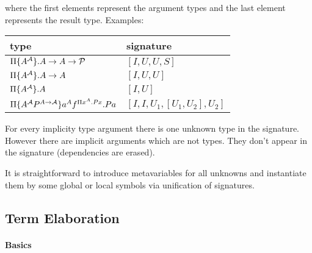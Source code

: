 where the first elements represent the argument types and the last element
represents the result type.
%
Examples:

\begin{tabular}{|l|l|}
    \hline
    type & signature
    \\ \hline
    $\Pi {\{A^{\cal A}\}}. A \to A \to {\cal P}$ &
    $[I, U, U, S]$
    \\
    $\Pi {\{A^{\cal A}\}}. A \to A$ &
    $[I, U, U]$
    \\
    $\Pi {\{A^{\cal A}\}}. A$ &
    $[I, U]$
    \\
    $\Pi {\{A^{\cal A}P^{A \to {\cal A}}\}} a^A f^{\Pi x^A. P x}. P a$ &
    $[I, I, U_1, [U_1, U_2], U_2]$
    \\
    \hline
\end{tabular}

For every implicity type argument there is one unknown type in the signature.
However there are implicit arguments which are not types. They don't appear in
the signature (dependencies are erased).

It is straightforward to introduce metavariables for all unknowns and
instantiate them by some global or local symbols via unification of signatures.







\subsection{Term Elaboration}

\begin{comment}
    auxialiary terms: (context, term, type), ...

    For each subterm a hole. A hole is a metavariable.
        Hole:
            Context
            required signature + opt. required type or supertype
            opt (term, type) if filled.

    Signature metavariables (for the unknowns). Instantiated by signature
    unification.
\end{comment}




\paragraph{Basics}

